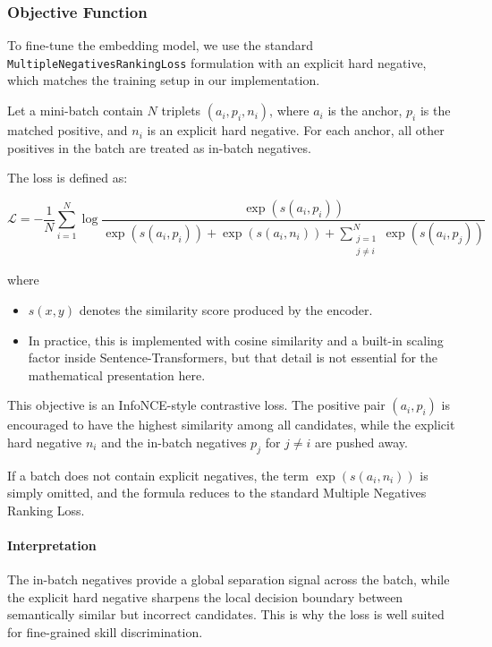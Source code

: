 \subsubsection{Objective Function}

To fine-tune the embedding model, we use the standard \texttt{MultipleNegativesRankingLoss} formulation with an explicit hard negative, which matches the training setup in our implementation.

Let a mini-batch contain $N$ triplets $(a_i, p_i, n_i)$, where $a_i$ is the anchor, $p_i$ is the matched positive, and $n_i$ is an explicit hard negative. For each anchor, all other positives in the batch are treated as in-batch negatives.

The loss is defined as:

\begin{equation}
\mathcal{L}
= -\frac{1}{N} \sum_{i=1}^{N}
\log
\frac{\exp\left(s(a_i, p_i)\right)}
{\exp\left(s(a_i, p_i)\right)
+ \exp\left(s(a_i, n_i)\right)
+ \sum_{\substack{j=1 \\ j \neq i}}^{N} \exp\left(s(a_i, p_j)\right)}
\end{equation}

where

\begin{itemize}
    \item $s(x,y)$ denotes the similarity score produced by the encoder.
    \item In practice, this is implemented with cosine similarity and a built-in scaling factor inside Sentence-Transformers, but that detail is not essential for the mathematical presentation here.
\end{itemize}

This objective is an InfoNCE-style contrastive loss. The positive pair $(a_i, p_i)$ is encouraged to have the highest similarity among all candidates, while the explicit hard negative $n_i$ and the in-batch negatives $p_j$ for $j \neq i$ are pushed away.

If a batch does not contain explicit negatives, the term $\exp(s(a_i,n_i))$ is simply omitted, and the formula reduces to the standard Multiple Negatives Ranking Loss.

\paragraph{Interpretation}
The in-batch negatives provide a global separation signal across the batch, while the explicit hard negative sharpens the local decision boundary between semantically similar but incorrect candidates. This is why the loss is well suited for fine-grained skill discrimination.